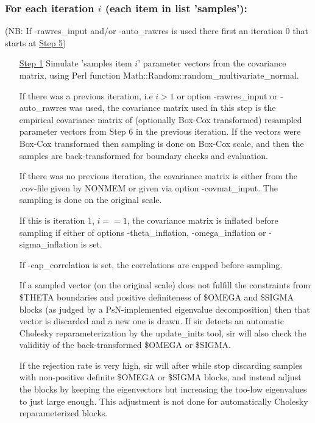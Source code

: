 \subsubsection*{For each iteration $i$ (each item in list 'samples'):}
(NB: If -rawres\_input and/or -auto\_rawres is used there first an iteration 0 that starts at \underline{Step 5})
\begin{itemize}
\item[\underline{Step 1}]
Simulate 'samples item $i$' parameter vectors from the covariance matrix, using Perl function Math::Random::random\_multivariate\_normal.

\noindent If there was a previous iteration, i.e $i>1$ or option -rawres\_input or -auto\_rawres was used, the covariance matrix used in this step is the empirical covariance matrix of (optionally Box-Cox transformed) resampled parameter vectors from Step 6 in the previous iteration.
If the vectors were Box-Cox transformed then sampling is done on Box-Cox scale, and then the samples are back-transformed for boundary checks and evaluation.

\noindent If there was no previous iteration, the covariance matrix is either from the .cov-file given by NONMEM or given via option -covmat\_input. The sampling is done on the original scale.

\noindent If this is iteration 1, $i==1$, the covariance matrix is inflated before sampling if either of options -theta\_inflation, -omega\_inflation or -sigma\_inflation is set.

\noindent If -cap\_correlation is set, the correlations are capped before sampling.

\noindent If a sampled vector (on the original scale) does not fulfill the constraints from \$THETA boundaries
and positive definiteness of \$OMEGA and \$SIGMA blocks (as judged by a PsN-implemented eigenvalue decomposition) then that vector is discarded and a new one is drawn. If sir detects an automatic Cholesky reparameterization by the update\_inits tool, sir will also check the validitiy of the back-transformed \$OMEGA or \$SIGMA.

\noindent If the rejection rate is very high, sir will after while stop discarding samples with non-positive definite
\$OMEGA or \$SIGMA blocks, and instead adjust the blocks by keeping the eigenvectors but increasing the too-low eigenvalues to just large enough. This adjustment is not done for automatically Cholesky reparameterized blocks.


\end{itemize}
